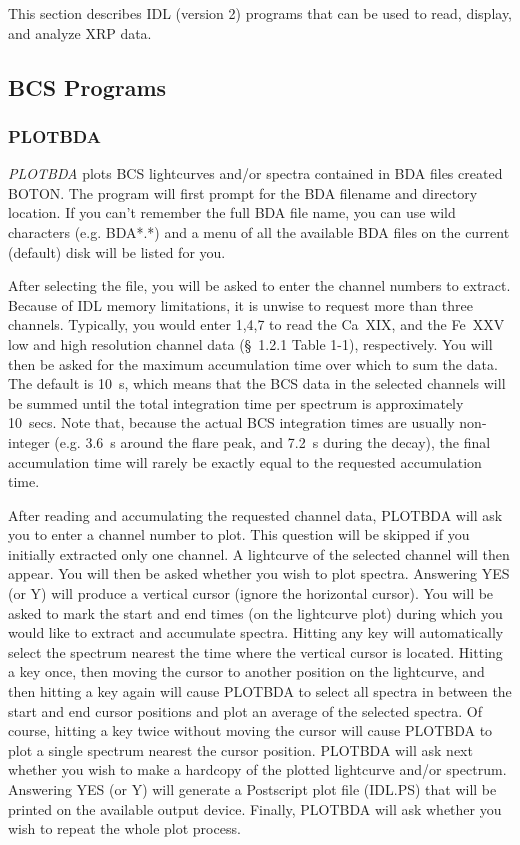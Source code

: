 This section describes IDL (version 2) programs that can be used
to read, display, and analyze XRP data.

\subsection{BCS Programs}    

\subsubsection{PLOTBDA}

{\em PLOTBDA} plots BCS lightcurves and/or spectra contained in BDA files
created BOTON.   The program will first prompt for the
BDA filename and directory location. If you can't remember the full BDA file
name, you can use wild characters (e.g. BDA*.*) and a menu of all the available
BDA files on the current (default) disk  will be listed for you.

After selecting the file, you will be asked to enter the channel numbers to
extract. Because of IDL memory limitations, it is unwise to request more than
three channels. Typically, you would enter 1,4,7 to read the Ca~XIX, and the
Fe~XXV low and high resolution channel data (\S~1.2.1 Table 1-1), respectively.
You will then be asked for the maximum accumulation time over which to sum the
data. The default is 10~s, which means that the BCS data in the selected
channels will be summed until the total integration time per spectrum is
approximately 10~secs. Note that, because the actual BCS integration times are
usually non-integer (e.g. 3.6~s around the flare peak, and 7.2~s during the
decay), the final accumulation time will rarely be exactly equal to the
requested accumulation time.

After reading and accumulating the requested channel data, PLOTBDA will ask you
to enter a channel number to plot. This question will be skipped if you
initially extracted only one channel. A lightcurve of the selected channel will
then appear. You will then be asked whether you wish to plot spectra. Answering
YES (or Y) will produce a vertical cursor (ignore the horizontal cursor). You
will be asked to mark the start and end times (on the lightcurve plot) during
which you would like to extract and accumulate spectra.   Hitting any key will
automatically select the spectrum nearest the time where the vertical cursor is
located. Hitting a key once, then moving the cursor to another position on the
lightcurve, and then hitting a key again will cause PLOTBDA to select all
spectra in between the start and end cursor positions and  plot an average of
the selected spectra. Of course, hitting a key twice without moving the cursor
will cause PLOTBDA to plot a single spectrum nearest the cursor position.
PLOTBDA will ask next whether you wish to make a hardcopy of the plotted
lightcurve and/or spectrum. Answering YES (or Y) will generate a Postscript
plot file (IDL.PS) that will be printed on the available output device.
Finally, PLOTBDA will ask whether you wish to repeat the whole plot process.

